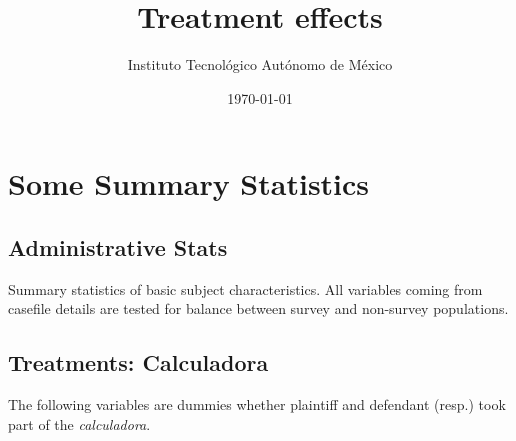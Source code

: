\documentclass[12pt]{article}
\theoremstyle{named}
\newcommand{\folder}{./Effect}
\begin{document}
\title{Treatment effects}

\author{Instituto Tecnológico Autónomo de México}
\date{\today}
\maketitle


\hrulefill


\section{Some Summary Statistics}

\vspace{7mm}

\subsection*{Administrative Stats}

Summary statistics of basic subject characteristics. All variables coming from casefile details are tested for balance between survey and non-survey populations.

\begin{center}
\scriptsize{}
\end{center}


\pagebreak

\begin{center}
\scriptsize{}
\end{center}

\pagebreak

\subsection*{Treatments: Calculadora}

The following variables are dummies whether plaintiff and defendant (resp.) took part of the \emph{calculadora}.\\

\begin{center}
\scriptsize{}
\end{center}


\begin{landscape}
\begin{center}
\scriptsize{}
\end{center}

\end{landscape}
\end{document}
